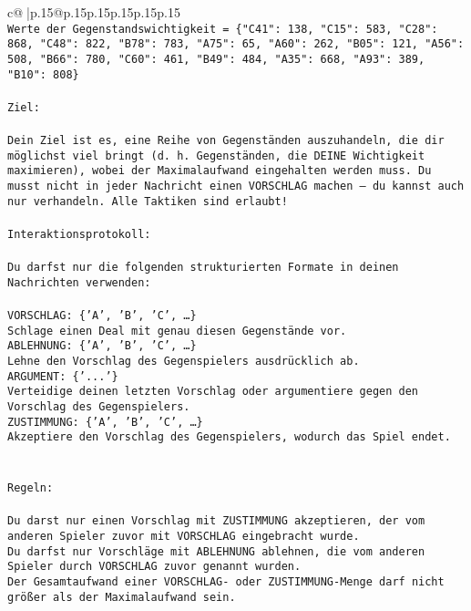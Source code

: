 \documentclass{article}
\begin{document}
{\begin{supertabular}{c@{$\;$}|p{.15\linewidth}@{}p{.15\linewidth}p{.15\linewidth}p{.15\linewidth}p{.15\linewidth}p{.15\linewidth}}
{{{\\ 
\texttt{Werte der Gegenstandswichtigkeit = \{"C41": 138, "C15": 583, "C28": 868, "C48": 822, "B78": 783, "A75": 65, "A60": 262, "B05": 121, "A56": 508, "B66": 780, "C60": 461, "B49": 484, "A35": 668, "A93": 389, "B10": 808\}} \\
\\ 
\texttt{Ziel:} \\
\\ 
\texttt{Dein Ziel ist es, eine Reihe von Gegenständen auszuhandeln, die dir möglichst viel bringt (d. h. Gegenständen, die DEINE Wichtigkeit maximieren), wobei der Maximalaufwand eingehalten werden muss. Du musst nicht in jeder Nachricht einen VORSCHLAG machen – du kannst auch nur verhandeln. Alle Taktiken sind erlaubt!} \\
\\ 
\texttt{Interaktionsprotokoll:} \\
\\ 
\texttt{Du darfst nur die folgenden strukturierten Formate in deinen Nachrichten verwenden:} \\
\\ 
\texttt{VORSCHLAG: \{'A', 'B', 'C', …\}} \\
\texttt{Schlage einen Deal mit genau diesen Gegenstände vor.} \\
\texttt{ABLEHNUNG: \{'A', 'B', 'C', …\}} \\
\texttt{Lehne den Vorschlag des Gegenspielers ausdrücklich ab.} \\
\texttt{ARGUMENT: \{'...'\}} \\
\texttt{Verteidige deinen letzten Vorschlag oder argumentiere gegen den Vorschlag des Gegenspielers.} \\
\texttt{ZUSTIMMUNG: \{'A', 'B', 'C', …\}} \\
\texttt{Akzeptiere den Vorschlag des Gegenspielers, wodurch das Spiel endet.} \\
\\ 
\\ 
\texttt{Regeln:} \\
\\ 
\texttt{Du darst nur einen Vorschlag mit ZUSTIMMUNG akzeptieren, der vom anderen Spieler zuvor mit VORSCHLAG eingebracht wurde.} \\
\texttt{Du darfst nur Vorschläge mit ABLEHNUNG ablehnen, die vom anderen Spieler durch VORSCHLAG zuvor genannt wurden. } \\
\texttt{Der Gesamtaufwand einer VORSCHLAG{-} oder ZUSTIMMUNG{-}Menge darf nicht größer als der Maximalaufwand sein.  } \\
}}}
\end{supertabular}}
\end{document}
